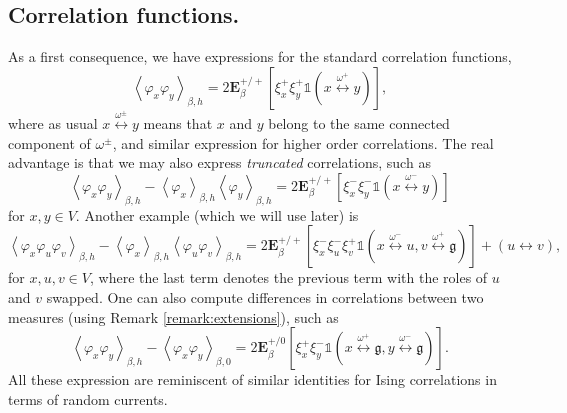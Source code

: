 \documentclass{article}
\numberwithin{equation}{section}
\theoremstyle{definition}
\theoremstyle{definition}
\theoremstyle{remark}
\newcommand{\E}{\mathbb{E}}
\newcommand\vp{\varphi}
\newcommand{\w}{\omega}
\renewcommand{\E}{\mathrm{\mathbf{E}}}
\newcommand{\Lp}{\xi^+}
\newcommand{\Lm}{\xi^-}
\renewcommand{\i}{\mathds{1}}
\newcommand{\g}{\mathfrak{g}}
\begin{document}
\subsection{Correlation functions.}
As a first consequence, we have expressions for the standard correlation functions, 
\begin{equation}\label{eq:corr1}
	\left< \vp_x \vp_y \right>_{\beta, h} = 2\E^{+ / +}_\beta [ \Lp_x \Lp_y \i( x \overset{\w^+}{\longleftrightarrow} y) ],
\end{equation} 
where as usual $x \overset{\w^\pm}{\longleftrightarrow} y$ means that $x$ and $y$ belong to the same connected component of $\w^\pm$, and similar expression for higher order correlations.
The real advantage is that we may also express \emph{truncated} correlations, such as 
\begin{equation}\label{eq:corr2}
	\left< \vp_x \vp_y \right>_{\beta,h} - \left< \vp_x \right>_{\beta,h} \left< \vp_y \right>_{\beta,h} = 2\E^{+ / +}_\beta[ \Lm_x \Lm_y \i(x \overset{\w^-}{\longleftrightarrow} y) ] 
\end{equation}
for $x,y \in V$. 
Another example (which we will use later) is
\begin{equation}\label{eq:corr3}
	\left< \vp_x \vp_u \vp_v \right>_{\beta,h} - \left< \vp_x \right>_{\beta,h} \left<\vp_u \vp_v \right>_{\beta,h} = 2\E^{+ / +}_\beta[ \Lm_x\Lm_u\Lp_v \i( x \overset{\w^-}{\longleftrightarrow} u, v \overset{\w^+}{\longleftrightarrow} \g )  ] + (u \leftrightarrow  v),
\end{equation}
for $x,u,v \in V$, where the last term denotes the previous term with the roles of $u$ and $v$ swapped.
One can also compute differences in correlations between two measures (using Remark \ref{remark:extensions}), such as
\begin{equation}\label{eq:corr4}
	\left< \vp_x \vp_y \right>_{\beta,h} - \left< \vp_x \vp_y \right>_{\beta,0} = 2 \E^{+ / 0}_\beta[ \Lp_x\Lm_y \i(x \overset{\w^+}{\longleftrightarrow} \g, y \overset{\w^-}{\longleftrightarrow} \g) ].
\end{equation} 
All these expression are reminiscent of similar identities for Ising correlations in terms of random currents.
\end{document}
